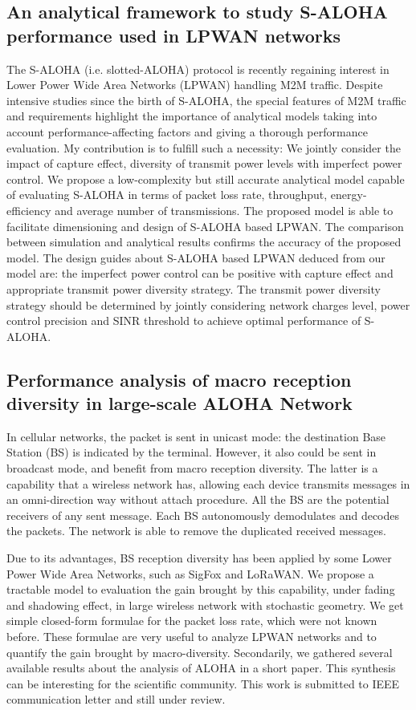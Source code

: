 \subsection{An analytical framework to study S-ALOHA performance used in LPWAN networks}
The S-ALOHA (i.e. slotted-ALOHA) protocol is recently regaining interest in Lower Power Wide Area Networks (LPWAN) handling M2M traffic. Despite intensive studies since the birth of S-ALOHA, the special features of M2M traffic and requirements highlight the importance of analytical models taking into account performance-affecting factors and giving a thorough performance evaluation. My contribution is to fulfill such a necessity: We jointly consider the impact of capture effect, diversity of transmit power levels with imperfect power control. We propose a low-complexity but still accurate analytical model capable of evaluating S-ALOHA in terms of packet loss rate, throughput, energy-efficiency and average number of transmissions. The proposed model is able to facilitate dimensioning and design of S-ALOHA based LPWAN. The comparison between simulation and analytical results confirms the accuracy of the proposed model. The design guides about S-ALOHA based LPWAN deduced from our model are: the imperfect power control can be positive with capture effect and appropriate transmit power diversity strategy. The transmit power diversity strategy should be determined by jointly considering network charges level, power control precision and SINR threshold to achieve optimal performance of S-ALOHA.

\subsection{Performance analysis of macro reception diversity in large-scale ALOHA Network}
In cellular networks, the packet is sent in unicast mode: the destination Base Station (BS) is indicated by the terminal. However, it also could be sent in broadcast mode, and benefit from macro reception diversity. The latter is a capability that a wireless network has,  allowing each device transmits messages in an omni-direction way without attach procedure. All the BS are the potential receivers of any sent message. Each BS autonomously demodulates and decodes the packets. The network is able to remove the duplicated received messages. 

Due to its advantages, BS reception diversity has been applied by some Lower Power Wide Area Networks, such as SigFox and LoRaWAN. We propose a tractable model to evaluation the gain brought by this capability, under fading and shadowing effect, in large wireless network with stochastic geometry. We get simple closed-form formulae for the packet loss rate, which were not known before. These formulae are very useful to analyze LPWAN networks and to quantify the gain brought by macro-diversity. Secondarily, we gathered several available results about the analysis of ALOHA in a short paper. This synthesis can be interesting for the scientific community. This work is submitted to IEEE communication letter and still under review.

